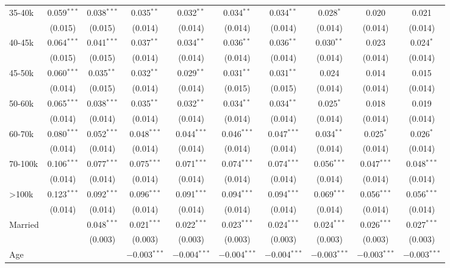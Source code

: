\begin{table}[!htbp]
\begin{tabular}{@{\extracolsep{5pt}}lccccccccc}
  35-40k & 0.059$^{***}$ & 0.038$^{***}$ & 0.035$^{**}$ & 0.032$^{**}$ & 0.034$^{**}$ & 0.034$^{**}$ & 0.028$^{*}$ & 0.020 & 0.021 \\ 
  & (0.015) & (0.015) & (0.014) & (0.014) & (0.014) & (0.014) & (0.014) & (0.014) & (0.014) \\ 
  40-45k & 0.064$^{***}$ & 0.041$^{***}$ & 0.037$^{**}$ & 0.034$^{**}$ & 0.036$^{**}$ & 0.036$^{**}$ & 0.030$^{**}$ & 0.023 & 0.024$^{*}$ \\ 
  & (0.015) & (0.015) & (0.014) & (0.014) & (0.014) & (0.014) & (0.014) & (0.014) & (0.014) \\ 
  45-50k & 0.060$^{***}$ & 0.035$^{**}$ & 0.032$^{**}$ & 0.029$^{**}$ & 0.031$^{**}$ & 0.031$^{**}$ & 0.024 & 0.014 & 0.015 \\ 
  & (0.014) & (0.015) & (0.014) & (0.014) & (0.015) & (0.015) & (0.014) & (0.014) & (0.014) \\ 
  50-60k & 0.065$^{***}$ & 0.038$^{***}$ & 0.035$^{**}$ & 0.032$^{**}$ & 0.034$^{**}$ & 0.034$^{**}$ & 0.025$^{*}$ & 0.018 & 0.019 \\ 
  & (0.014) & (0.014) & (0.014) & (0.014) & (0.014) & (0.014) & (0.014) & (0.014) & (0.014) \\ 
  60-70k & 0.080$^{***}$ & 0.052$^{***}$ & 0.048$^{***}$ & 0.044$^{***}$ & 0.046$^{***}$ & 0.047$^{***}$ & 0.034$^{**}$ & 0.025$^{*}$ & 0.026$^{*}$ \\ 
  & (0.014) & (0.014) & (0.014) & (0.014) & (0.014) & (0.014) & (0.014) & (0.014) & (0.014) \\ 
  70-100k & 0.106$^{***}$ & 0.077$^{***}$ & 0.075$^{***}$ & 0.071$^{***}$ & 0.074$^{***}$ & 0.074$^{***}$ & 0.056$^{***}$ & 0.047$^{***}$ & 0.048$^{***}$ \\ 
  & (0.014) & (0.014) & (0.014) & (0.014) & (0.014) & (0.014) & (0.014) & (0.014) & (0.014) \\ 
  >100k & 0.123$^{***}$ & 0.092$^{***}$ & 0.096$^{***}$ & 0.091$^{***}$ & 0.094$^{***}$ & 0.094$^{***}$ & 0.069$^{***}$ & 0.056$^{***}$ & 0.056$^{***}$ \\ 
  & (0.014) & (0.014) & (0.014) & (0.014) & (0.014) & (0.014) & (0.014) & (0.014) & (0.014) \\ 
  Married &  & 0.048$^{***}$ & 0.021$^{***}$ & 0.022$^{***}$ & 0.023$^{***}$ & 0.024$^{***}$ & 0.024$^{***}$ & 0.026$^{***}$ & 0.027$^{***}$ \\ 
  &  & (0.003) & (0.003) & (0.003) & (0.003) & (0.003) & (0.003) & (0.003) & (0.003) \\ 
  Age &  &  & $-$0.003$^{***}$ & $-$0.004$^{***}$ & $-$0.004$^{***}$ & $-$0.004$^{***}$ & $-$0.003$^{***}$ & $-$0.003$^{***}$ & $-$0.003$^{***}$ \\ 

\end{tabular}
\end{table}
